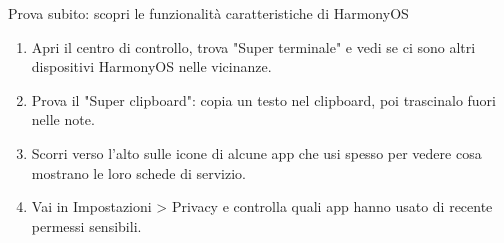 \begin{tcbpractice}{Prova subito: scopri le funzionalità caratteristiche di HarmonyOS}
\begin{enumerate}
  \item Apri il centro di controllo, trova "Super terminale" e vedi se ci sono altri dispositivi HarmonyOS nelle vicinanze.
  \item Prova il "Super clipboard": copia un testo nel clipboard, poi trascinalo fuori nelle note.
  \item Scorri verso l'alto sulle icone di alcune app che usi spesso per vedere cosa mostrano le loro schede di servizio.
  \item Vai in Impostazioni > Privacy e controlla quali app hanno usato di recente permessi sensibili.
\end{enumerate}

\end{tcbpractice}
